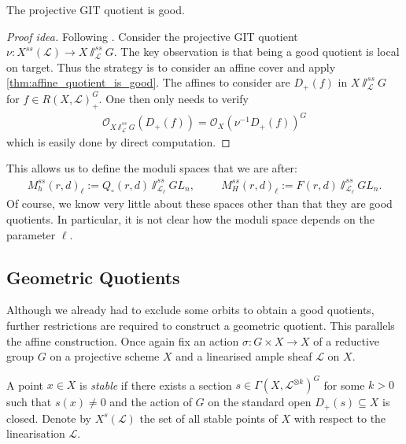 \documentclass[12pt]{ociamthesis}  %
\begin{document}
\begin{theorem}
  The projective GIT quotient is good.
  \begin{proof}[Proof idea]
    Following \cite[Theorem 5.3]{hoskins2016}.
    Consider the projective GIT quotient
    $\nu : X^{ss}(\mathscr L)\to X\sslash^{ss}_{\mathscr L} G$.
    The key observation is that being a good quotient is local on target.
    Thus the strategy is to consider an affine cover and apply
    \ref{thm:affine_quotient_is_good}. The affines to consider
    are $D_+(f)$ in $X\sslash^{ss}_{\mathscr L} G$
    for $f\in R(X,\mathscr L)^G_+$. One then only needs to verify
    \begin{align*}
      \mathscr O_{X\sslash^{ss}_{\mathscr L} G}(D_+(f)) = \mathscr O_X(\nu^{-1} D_+(f))^G
    \end{align*}
    which is easily done by direct computation.
  \end{proof}
\end{theorem}

\begin{example}
  This allows us to define the moduli spaces that we are after:
  \begin{align*}
    M^{ss}_h(r,d)_\ell := Q_\circ(r,d)\sslash^{ss}_{{\mathscr L}_\ell} GL_n, \hspace{1cm}
    M^{ss}_H(r,d)_\ell := F(r,d)\sslash^{ss}_{{\mathscr L}_\ell} GL_n.
  \end{align*}
  Of course, we know very little about these spaces other than that
  they are good quotients. In particular, it is not clear how the moduli
  space depends on the parameter $\ell$.
\end{example}

\missingsection

\subsection{Geometric Quotients}

Although we already had to exclude some orbits to obtain a good
quotients, further restrictions are required to construct a geometric
quotient. This parallels the affine construction.
Once again fix an action $\sigma : G\times X\to X$ of a
reductive group $G$ on a projective scheme $X$ and a linearised
ample sheaf $\mathscr L$ on $X$.

\begin{definition}
  A point $x\in X$ is \emph{stable} if there exists a section
  $s\in\Gamma(X,\mathscr L^{\otimes k})^G$ for some $k>0$ such that $s(x)\neq 0$
  and the action of $G$ on the standard open $D_+(s)\subseteq X$ is closed.
  Denote by $X^s(\mathscr L)$ the set of all stable points of $X$ with respect
  to the linearisation $\mathscr L$.
\end{definition}
\end{document}
